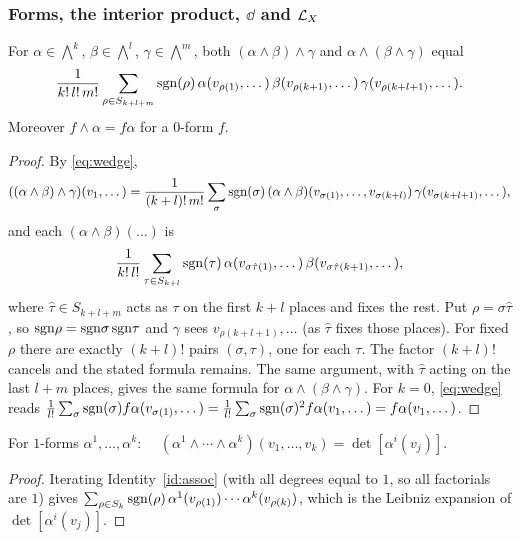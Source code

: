 \subsubsection*{Forms, the interior product, $\dd$ and $\mathcal{L}_X$}

\begin{identity}\label{id:assoc}
For $\alpha\in\bigwedge^k$, $\beta\in\bigwedge^l$, $\gamma\in\bigwedge^m$, both $(\alpha\wedge\beta)\wedge\gamma$ and $\alpha\wedge(\beta\wedge\gamma)$ equal
\[
\frac1{k!\,l!\,m!}\sum_{\rho\in S_{k+l+m}}\mathrm{sgn}(\rho)\,\alpha(v_{\rho(1)},\dots)\,\beta(v_{\rho(k+1)},\dots)\,\gamma(v_{\rho(k+l+1)},\dots).
\]
Moreover $f\wedge\alpha=f\alpha$ for a $0$-form $f$.
\end{identity}
\begin{proof}
 By \eqref{eq:wedge},
\[
((\alpha\wedge\beta)\wedge\gamma)(v_1,\dots)=\frac1{(k+l)!\,m!}\sum_{\sigma}\mathrm{sgn}(\sigma)\,(\alpha\wedge\beta)(v_{\sigma(1)},\dots,v_{\sigma(k+l)})\,\gamma(v_{\sigma(k+l+1)},\dots),
\]
and each $(\alpha\wedge\beta)(\dots)$ is
\[
\frac1{k!\,l!}\sum_{\tau\in S_{k+l}}\mathrm{sgn}(\tau)\,\alpha(v_{\sigma\hat\tau(1)},\dots)\,\beta(v_{\sigma\hat\tau(k+1)},\dots),
\]
where $\hat\tau\in S_{k+l+m}$ acts as $\tau$ on the first $k+l$ places and fixes the rest.
 Put $\rho=\sigma\hat\tau$, so $\mathrm{sgn}\rho=\mathrm{sgn}\sigma\,\mathrm{sgn}\tau$ and $\gamma$ sees $v_{\rho(k+l+1)},\dots$ (as $\hat\tau$ fixes those places).
For fixed $\rho$ there are exactly $(k+l)!$ pairs $(\sigma,\tau)$, one for each $\tau$. The factor $(k+l)!$ cancels and the stated formula remains.
 The same argument, with $\hat\tau$ acting on the last $l+m$ places, gives the same formula for $\alpha\wedge(\beta\wedge\gamma)$.
 For $k=0$, \eqref{eq:wedge} reads $\frac1{l!}\sum_\sigma\mathrm{sgn}(\sigma)f\alpha(v_{\sigma(1)},\dots)=\frac1{l!}\sum_\sigma\mathrm{sgn}(\sigma)^2f\alpha(v_1,\dots)=f\alpha(v_1,\dots)$.
\end{proof}

\begin{identity}\label{id:det}
For $1$-forms $\alpha^1,\dots,\alpha^k$: $\quad(\alpha^1\wedge\cdots\wedge\alpha^k)(v_1,\dots,v_k)=\det[\alpha^i(v_j)]$.
\end{identity}
\begin{proof}
Iterating Identity~\ref{id:assoc} (with all degrees equal to $1$, so all factorials are $1$) gives
$\sum_{\rho\in S_k}\mathrm{sgn}(\rho)\,\alpha^1(v_{\rho(1)})\cdots\alpha^k(v_{\rho(k)})$, which is the Leibniz expansion of $\det[\alpha^i(v_j)]$.
\end{proof}

